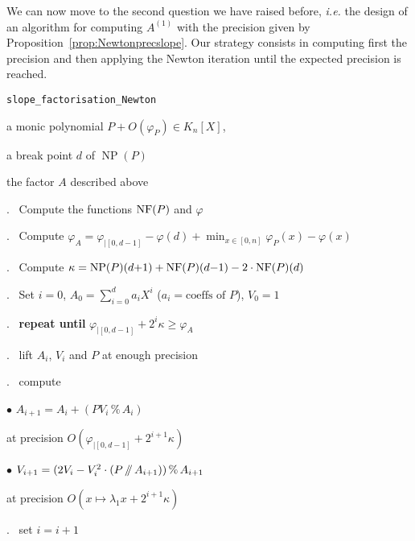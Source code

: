 \documentclass{sig-alternate-05-2015}
\DeclareMathOperator{\NP}{NP}
\newcommand{\NF}{\text{\rm NF}}
\renewcommand{\mod}{\,\%\,}
\renewcommand{\div}{\,/\hspace{-0.3em}/\,}
\begin{document}
We can now move to the second question we have raised before, 
\emph{i.e.} the design of an algorithm for computing $A^{(1)}$ with the 
precision given by Proposition~\ref{prop:Newtonprecslope}. Our strategy 
consists in computing first the precision and then applying the Newton 
iteration until the expected precision is reached. 

\noindent\hrulefill

 {\tt slope\_factorisation\_Newton}

 a monic polynomial $P + O(\varphi_P) \in K_n[X]$,

\noindent{}a break point $d$ of $\NP(P)$

 the factor $A$ described above

\smallskip{}.\ %
Compute the functions $\NF(P)$ and $\varphi$

\smallskip{}.\ %
Compute $\varphi_A = \varphi_{|[0,d-1]} - \varphi(d) + \min_{x \in [0,n]}
\varphi_P(x) - \varphi(x)$

\smallskip{}.\ %
Compute $\kappa = \NP(P)(d{+}1) + \NF(P)(d{-}1) - 2 \cdot \NF(P)(d)$

\smallskip{}.\ %
Set $i = 0$, $A_0 = \sum_{i=0}^d a_i X^i$
($a_i = \text{coeffs of } P$), $V_0 = 1$

\smallskip{}.\ %
{\bf repeat until} $\varphi_{|[0,d{-}1]} + 2^i \kappa \geq \varphi_A$

\smallskip{}.\ \hspace{5mm}%
lift $A_i$, $V_i$ and $P$ at enough precision

\smallskip{}.\ \hspace{5mm}%
compute 

\smallskip

\hspace{1cm}$\bullet$
$A_{i+1} = A_i + (P V_i \mod A_i)$

\hspace{1cm}\phantom{$\bullet$ }%
at precision $O(\varphi_{|[0,d{-}1]} + 2^{i+1} \kappa)$

\smallskip

\hspace{1cm}$\bullet$
$V_{i+1} = (2 V_i - V_i^2 \cdot (P \div A_{i+1})) \mod A_{i+1}$

\hspace{1cm}\phantom{$\bullet$ }%
at precision $O(x \mapsto \lambda_1 x + 2^{i+1}\kappa)$

\smallskip{}.\ \hspace{5mm}%
set $i = i+1$
\end{document}
